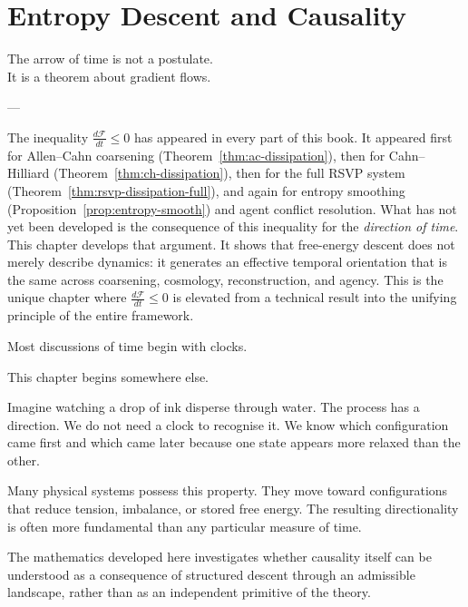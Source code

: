 
\chapter{Entropy Descent and Causality}
\label{ch:entropy-causality}

\epigraph{%
  The arrow of time is not a postulate.\\
  It is a theorem about gradient flows.%
}{---}

\begin{WhyChapter}
  The inequality $\frac{d\mathcal{F}}{dt} \leq 0$ has appeared
  in every part of this book.
  It appeared first for Allen--Cahn coarsening
  (Theorem~\ref{thm:ac-dissipation}), then for Cahn--Hilliard
  (Theorem~\ref{thm:ch-dissipation}), then for the full RSVP
  system (Theorem~\ref{thm:rsvp-dissipation-full}), and again
  for entropy smoothing (Proposition~\ref{prop:entropy-smooth})
  and agent conflict resolution.
  What has not yet been developed is the consequence of this
  inequality for the \emph{direction of time}.
  This chapter develops that argument.
  It shows that free-energy descent does not merely describe
  dynamics: it generates an effective temporal orientation
  that is the same across coarsening, cosmology, reconstruction,
  and agency.
  This is the unique chapter where $\frac{d\mathcal{F}}{dt} \leq 0$
  is elevated from a technical result into the unifying principle
  of the entire framework.
\end{WhyChapter}


\begin{ChapterIntro}
Most discussions of time begin with clocks.

This chapter begins somewhere else.

Imagine watching a drop of ink disperse through water. The process has a direction. We do not need a clock to recognise it. We know which configuration came first and which came later because one state appears more relaxed than the other.

Many physical systems possess this property. They move toward configurations that reduce tension, imbalance, or stored free energy. The resulting directionality is often more fundamental than any particular measure of time.

The mathematics developed here investigates whether causality itself can be understood as a consequence of structured descent through an admissible landscape, rather than as an independent primitive of the theory.
\end{ChapterIntro}

